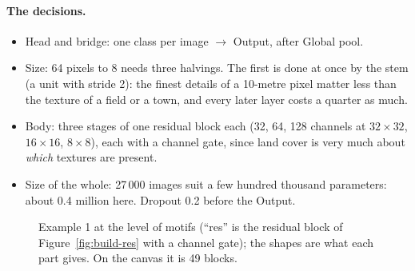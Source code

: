 \paragraph{The decisions.}
\begin{itemize}[nosep]
  \item Head and bridge: one class per image $\rightarrow$ Output, after Global pool.
  \item Size: 64 pixels to 8 needs three halvings. The first is done at once by the stem (a unit with stride 2): the finest details of a
        10-metre pixel matter less than the texture of a field or a town, and every later layer costs a quarter as much.
  \item Body: three stages of one residual block each (32, 64, 128 channels at $32\times32$, $16\times16$, $8\times8$), each with a
        channel gate, since land cover is very much about \emph{which} textures are present.
  \item Size of the whole: 27\,000 images suit a few hundred thousand parameters: about 0.4 million here. Dropout 0.2 before the Output.
\end{itemize}

\begin{figure}[htbp]\centering
{}
\caption{Example 1 at the level of motifs (``res'' is the residual block of Figure~\ref{fig:build-res} with a channel gate); the
shapes are what each part gives. On the canvas it is 49 blocks.}
\end{figure}

